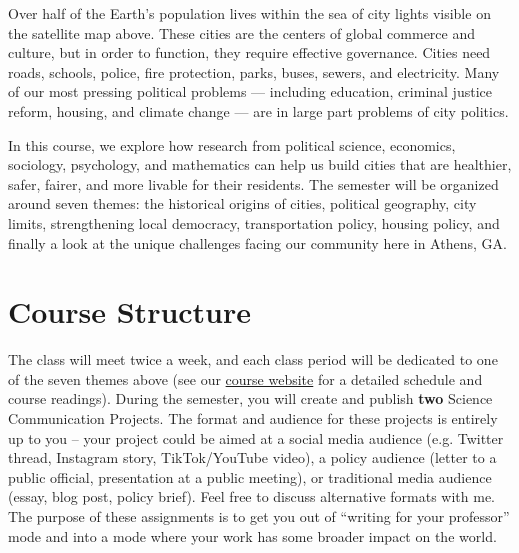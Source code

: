 \documentclass[11pt, letterpaper]{article}
\begin{document}
\noindent Over half of the Earth's population lives within the sea of city lights visible on the satellite map above. These cities are the centers of global commerce and culture, but in order to function, they require effective governance. Cities need roads, schools, police, fire protection, parks, buses, sewers, and electricity. Many of our most pressing political problems --- including education, criminal justice reform, housing, and climate change --- are in large part problems of city politics.

In this course, we explore how research from political science, economics, sociology, psychology, and mathematics can help us build cities that are healthier, safer, fairer, and more livable for their residents. The semester will be organized around seven themes: the historical origins of cities, political geography, city limits, strengthening local democracy, transportation policy, housing policy, and finally a look at the unique challenges facing our community here in Athens, GA. 



\section*{Course Structure}

The class will meet twice a week, and each class period will be dedicated to one of the seven themes above (see our \href{https://joeornstein.github.io/pols-4641/}{course website} for a detailed schedule and course readings). During the semester, you will create and publish \textbf{two} Science Communication Projects. The format and audience for these projects is entirely up to you -- your project could be aimed at a social media audience (e.g. Twitter thread, Instagram story, TikTok/YouTube video), a policy audience (letter to a public official, presentation at a public meeting), or traditional media audience (essay, blog post, policy brief). Feel free to discuss alternative formats with me. The purpose of these assignments is to get you out of ``writing for your professor'' mode and into a mode where your work has some broader impact on the world.
\end{document}
